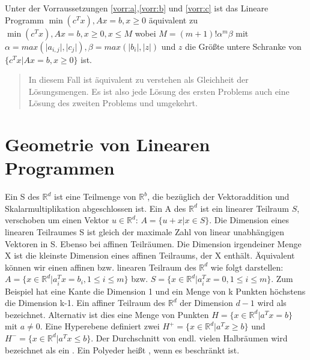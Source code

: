 \begin{theorem}
Unter der Vorraussetzungen \ref{vorr:a},\ref{vorr:b} und \ref{vorr:c} ist das Lineare Programm $\min(c^Tx), Ax=b, x \geq 0$ äquivalent zu $\min(c^Tx), Ax=b, x \geq 0, x\leq M$ wobei %
$M = (m+1)!\alpha^m\beta$ mit $\alpha = max(\lvert a_{i,j}\rvert,\lvert c_{j}\rvert), \beta = max(\lvert b_i\rvert, \lvert z\rvert)$ und $z$ die Größte untere Schranke von $\{c^Tx | Ax=b, x \geq 0\}$ ist. 
\end{theorem}

\begin{quote}
In diesem Fall ist äquivalent zu verstehen als Gleichheit der Lösungsmengen. Es ist also jede Lösung des ersten Problems auch eine Lösung des zweiten Problems und umgekehrt.
\end{quote}

\section{Geometrie von Linearen Programmen}

Ein  S des $\mathbb R^d$ ist eine Teilmenge von $\mathbb R^b$, die bezüglich der Vektoraddition und Skalarmultiplikation abgeschlossen ist. Ein  A des $\mathbb R^d$ ist ein linearer Teilraum $S$, verschoben um einen Vektor $u \in \mathbb R^d$: $A=\{u+x|x \in S\}$.
Die Dimension eines linearen Teilraumes S ist gleich der maximale Zahl von linear unabhängigen Vektoren in S. Ebenso bei affinen Teilräumen. Die Dimension irgendeiner Menge X ist die kleinste Dimension eines affinen Teilraums, der X enthält. Äquivalent können wir einen affinen bzw. linearen Teilraum des $\mathbb R^d$ wie folgt darstellen: $A = \{ x \in \mathbb R^d | a_i^Tx = b_i , 1 \leq i \leq m \}$ bzw. $S = \{ x \in \mathbb R^d | a_i^Tx = 0 , 1 \leq i \leq m \}$.
Zum Beispiel hat eine Kante die Dimension 1 und ein Menge von k Punkten höchstens die Dimension k-1.
Ein affiner Teilraum des $\mathbb R^d$ der Dimension $d-1$ wird als  bezeichnet. Alternativ ist dies eine Menge von Punkten $H=\{x \in \mathbb R^d |a^Tx=b\}$ mit $a \neq 0$. Eine Hyperebene definiert zwei  $H^{+} = \{x \in \mathbb R^d |a^Tx \geq b\}$ und $H^{-} = \{x \in \mathbb R^d |a^Tx \leq b\}$.
Der Durchschnitt von endl. vielen Halbräumen wird bezeichnet als ein . Ein Polyeder heißt , wenn es beschränkt ist.

